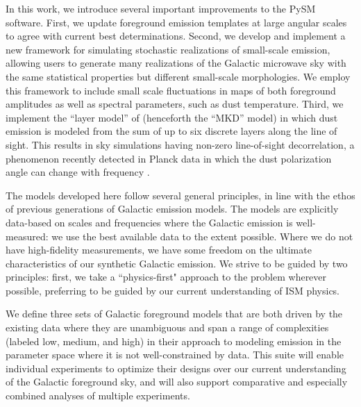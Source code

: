 \documentclass[twocolumn]{aastex631}
\begin{document}
In this work, we introduce several important improvements to the PySM software. First, we update foreground emission templates at large angular scales to agree with current best determinations. Second, we develop and implement a new framework for simulating stochastic realizations of small-scale emission, allowing users to generate many realizations of the Galactic microwave sky with the same statistical properties but different small-scale morphologies. We employ this framework to include small scale fluctuations in maps of both foreground amplitudes as well as spectral parameters, such as dust temperature. Third, we implement the ``layer model'' of \citet{Martinez-Solaeche:2018} (henceforth the ``MKD'' model) in which dust emission is modeled from the sum of up to six discrete layers along the line of sight. This results in sky simulations having non-zero line-of-sight decorrelation, a phenomenon recently detected in Planck data in which the dust polarization angle can change with frequency \citep{Pelgrims:2021}. 

The models developed here follow several general principles, in line with the ethos of previous generations of Galactic emission models. The models are explicitly data-based on scales and frequencies where the Galactic emission is well-measured: we use the best available data to the extent possible. Where we do not have high-fidelity measurements, we have some freedom on the ultimate characteristics of our synthetic Galactic emission. We strive to be guided by two principles: first, we take a ``physics-first" approach to the problem wherever possible, preferring to be guided by our current understanding of ISM physics. 


We define three sets of Galactic foreground models that are both driven by the existing data where they are unambiguous and span a range of complexities (labeled low, medium, and high) in their approach to modeling emission in the parameter space where it is not well-constrained by data. This suite will enable individual experiments to optimize their designs over our current understanding of the Galactic foreground sky, and will also support comparative and especially combined analyses of multiple experiments. 
\end{document}

